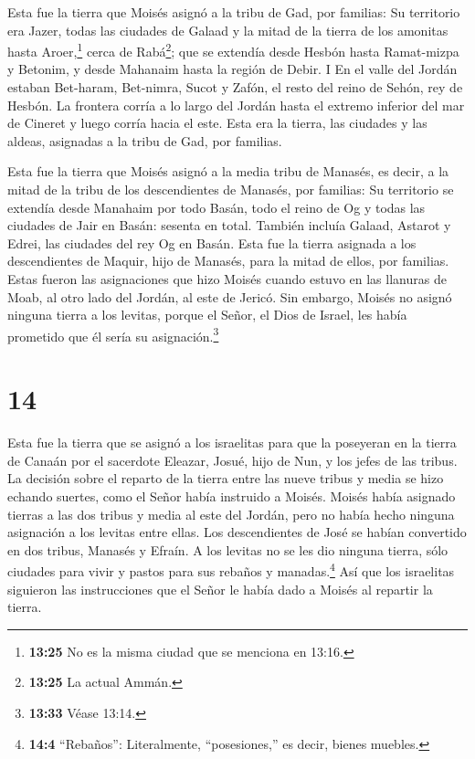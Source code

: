  Esta fue la tierra que Moisés asignó a la tribu de Gad,
por familias:  Su territorio era Jazer, todas las ciudades
de Galaad y la mitad de la tierra de los amonitas hasta
Aroer,\footnote{\textbf{13:25} No es la misma ciudad que se menciona en
  13:16.} cerca de Rabá\footnote{\textbf{13:25} La actual Ammán.};
 que se extendía desde Hesbón hasta Ramat-mizpa y Betonim,
y desde Mahanaim hasta la región de Debir.  I En el valle
del Jordán estaban Bet-haram, Bet-nimra, Sucot y Zafón, el resto del
reino de Sehón, rey de Hesbón. La frontera corría a lo largo del Jordán
hasta el extremo inferior del mar de Cineret y luego corría hacia el
este.  Esta era la tierra, las ciudades y las aldeas,
asignadas a la tribu de Gad, por familias.

 Esta fue la tierra que Moisés asignó a la media tribu de
Manasés, es decir, a la mitad de la tribu de los descendientes de
Manasés, por familias:  Su territorio se extendía desde
Manahaim por todo Basán, todo el reino de Og y todas las ciudades de
Jair en Basán: sesenta en total.  También incluía Galaad,
Astarot y Edrei, las ciudades del rey Og en Basán. Esta fue la tierra
asignada a los descendientes de Maquir, hijo de Manasés, para la mitad
de ellos, por familias.  Estas fueron las asignaciones que
hizo Moisés cuando estuvo en las llanuras de Moab, al otro lado del
Jordán, al este de Jericó.  Sin embargo, Moisés no asignó
ninguna tierra a los levitas, porque el Señor, el Dios de Israel, les
había prometido que él sería su asignación.\footnote{\textbf{13:33}
  Véase 13:14.}

\hypertarget{section-13}{%
\section{14}\label{section-13}}

 Esta fue la tierra que se asignó a los israelitas para que
la poseyeran en la tierra de Canaán por el sacerdote Eleazar, Josué,
hijo de Nun, y los jefes de las tribus.  La decisión sobre
el reparto de la tierra entre las nueve tribus y media se hizo echando
suertes, como el Señor había instruido a Moisés.  Moisés
había asignado tierras a las dos tribus y media al este del Jordán, pero
no había hecho ninguna asignación a los levitas entre ellas.
 Los descendientes de José se habían convertido en dos
tribus, Manasés y Efraín. A los levitas no se les dio ninguna tierra,
sólo ciudades para vivir y pastos para sus rebaños y manadas.\footnote{\textbf{14:4}
  ``Rebaños'': Literalmente, ``posesiones,'' es decir, bienes muebles.}
 Así que los israelitas siguieron las instrucciones que el
Señor le había dado a Moisés al repartir la tierra.

